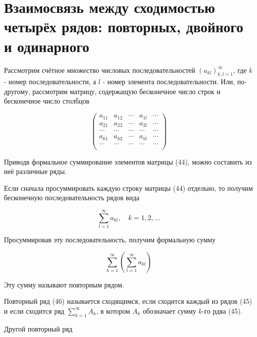 \section{Взаимосвязь между сходимостью четырёх рядов: повторных, двойного и одинарного}

Рассмотрим счётное множество числовых последовательностей $(a_{kl})_{k,l = 1}^\infty$, где $k$ - номер последовательности, а $l$ - номер элемента последовательности. Или, по-другому, рассмотрим матрицу, содержащую бесконечное число строк и бесконечное число столбцов

\begin{equation}
	\begin{pmatrix}
		a_{11} & a_{12} & \cdots & a_{1l} &  \cdots \\
		a_{21} & a_{22} & \cdots & a_{2l} &  \cdots \\
		\cdots & \cdots & \cdots & \cdots & \cdots \\
		a_{k1} & a_{k2} & \cdots & a_{kl} &  \cdots \\
		\cdots & \cdots & \cdots & \cdots & \cdots \\
	\end{pmatrix}
\end{equation}

Приводя формальное суммирование элементов матрицы (44), можно составить из неё различные ряды.

Если сначала просуммировать каждую строку матрицы (44) отдельно, то получим бесконечную последовательность рядов вида

\begin{equation}
	\displaystyle\sum_{l = 1}^\infty a_{kl},\quad k = 1, 2, ...
\end{equation}

Просуммировав эту последовательность, получим формальную сумму

\begin{equation}
	\displaystyle\sum_{k = 1}^\infty\left( \displaystyle\sum_{l = 1}^\infty a_{kl} \right)
\end{equation}

Эту сумму называют повторным рядом.

\begin{definition}
	Повторный ряд (46) называется сходящимся, если сходится каждый из рядов (45) и если сходится ряд {\small $\displaystyle\sum_{k = 1}^\infty A_k$}, в котором $A_k$ обозначает сумму $k$-го рдяа (45).
\end{definition}

Другой повторный ряд 

